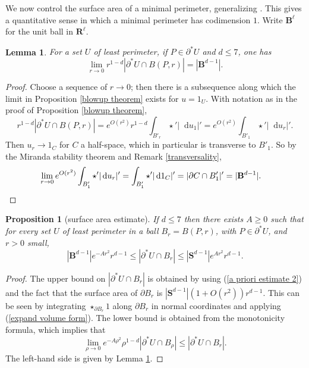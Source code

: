 \documentclass[reqno,10pt]{amsart}
\newcommand{\RR}{\mathbf{R}}
\newcommand{\Sph}{\mathbf S}
\newcommand{\Ball}{\mathbf{B}}
\newcommand*\dif{\mathop{}\!\mathrm{d}}
\newtheorem{lemma}[theorem]{Lemma}
\newtheorem{proposition}[theorem]{Proposition}
\theoremstyle{definition}
\numberwithin{equation}{section}
\begin{document}
We now control the surface area of a minimal perimeter, generalizing \cite[Remark 5.13]{Giusti77}.
This gives a quantitative sense in which a minimal perimeter has codimension $1$.
Write $\Ball^\ell$ for the unit ball in $\RR^\ell$.

\begin{lemma}\label{least perimeter minimal size}
For a set $U$ of least perimeter, if $P \in \partial^* U$ and $d \leq 7$, one has
$$\lim_{r \to 0} r^{1 - d} |\partial^* U \cap B(P, r)| = |\Ball^{d - 1}|.$$
\end{lemma}
\begin{proof}
Choose a sequence of $r \to 0$; then there is a subsequence along which the limit in Proposition \ref{blowup theorem} exists for $u = 1_U$.
With notation as in the proof of Proposition \ref{blowup theorem},
$$r^{1 - d} |\partial^* U \cap B(P, r)| = e^{O(r^2)} r^{1 - d}\int_{B'_r} \star'|\dif u_1|' = e^{O(r^2)} \int_{B'_1} \star'|\dif u_r|'.$$
Then $u_r \to 1_C$ for $C$ a half-space, which in particular is transverse to $B'_1$.
So by the Miranda stability theorem and Remark \ref{transversality},
\begin{align*}
\lim_{r \to 0} e^{O(r^2)} \int_{B'_1} \star'|\dif u_r|' &= \int_{B'_1} \star'|\dif 1_C|' = |\partial C \cap B'_1|' = |\Ball^{d - 1}|. \qedhere
\end{align*}
\end{proof}

\begin{proposition}[surface area estimate]\label{doubling dimension}
If $d \leq 7$ then there exists $A \geq 0$ such that for every set $U$ of least perimeter in a ball $B_r = B(P, r)$, with $P \in \partial^* U$, and $r > 0$ small,
$$|\Ball^{d - 1}|e^{-Ar^2}r^{d - 1} \leq |\partial^*U \cap B_r| \leq |\Sph^{d - 1}|e^{Ar^2} r^{d - 1}.$$
\end{proposition}
\begin{proof}
The upper bound on $|\partial^* U \cap B_r|$ is obtained by using (\ref{a priori estimate 2}) and the fact that the surface area of $\partial B_r$ is $|\Sph^{d - 1}|(1 + O(r^2))r^{d - 1}$.
This can be seen by integrating $\star_{\partial B_r} 1$ along $\partial B_r$ in normal coordinates and applying (\ref{expand volume form}).
The lower bound is obtained from the monotonicity formula, which implies that
$$\lim_{\rho \to 0} e^{-A\rho^2} \rho^{1 - d} |\partial^* U \cap B_\rho| \leq |\partial^* U \cap B_r|.$$
The left-hand side is given by Lemma \ref{least perimeter minimal size}.
\end{proof}
\end{document}
